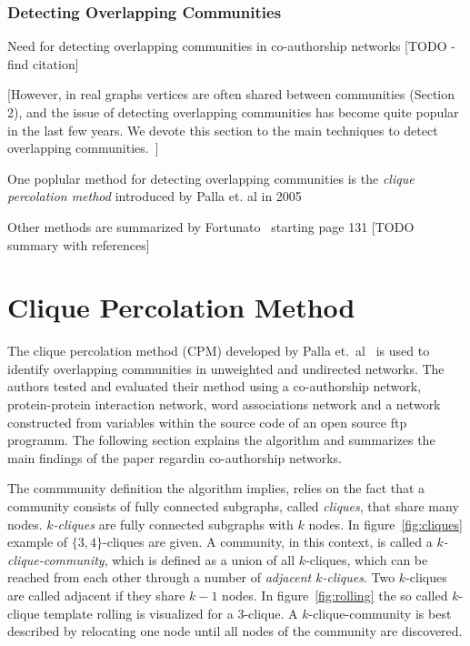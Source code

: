\documentclass[runningheads,a4paper]{llncs}
\begin{document}
\subsubsection{Detecting Overlapping Communities}
\label{related-communities-overlapping}
Need for detecting overlapping communities in co-authorship networks [TODO - find citation]

[However, in real graphs vertices are often shared between communities (Section 2), and the issue of detecting overlapping communities has become quite popular in the last few years. We devote this section to the main techniques to detect overlapping communities.~\cite{fortunato2010community}]

One poplular method for detecting overlapping communities is the \emph{clique percolation method} introduced by Palla et. al in 2005~\cite{palla2005uncovering}

Other methods are summarized by Fortunato~\cite{fortunato2010community} starting page 131 [TODO summary with references]

\section{Clique Percolation Method}
\label{cpm}
The clique percolation method (CPM) developed by Palla et.~al~\cite{palla2007quantifying} is used to identify overlapping communities in unweighted and undirected networks.
The authors tested and evaluated their method using a co-authorship network, protein-protein interaction network, word associations network and a network constructed from variables within the source code of an open source ftp programm.
The following section explains the algorithm and summarizes the main findings of the paper regardin co-authorship networks.

The commmunity definition the algorithm implies, relies on the fact that a community consists of fully connected subgraphs, called \emph{cliques}, that share many nodes.
\emph{$k$-cliques} are fully connected subgraphs with $k$ nodes.
In figure~\ref{fig:cliques} example of $\{3,4\}$-cliques are given.
A community, in this context, is called a \emph{$k$-clique-community}, which is defined as a union of all $k$-cliques, which can be reached from each other through a number of \emph{adjacent $k$-cliques}.
Two $k$-cliques are called adjacent if they share $k-1$ nodes.
In figure~\ref{fig:rolling} the so called $k$-clique template rolling is visualized for a $3$-clique.
A $k$-clique-community is best described by relocating one node until all nodes of the community are discovered.
\end{document}
